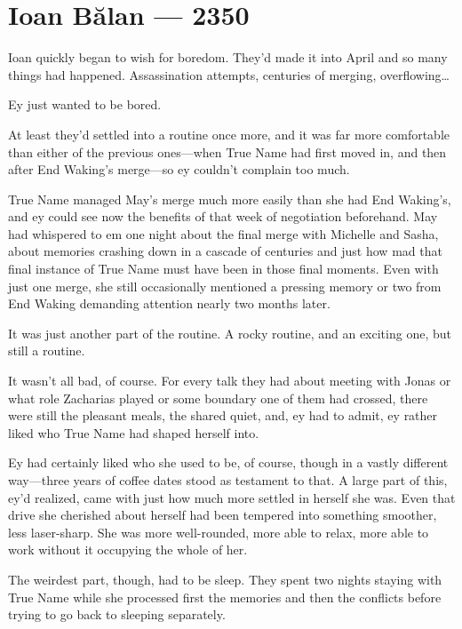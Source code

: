 \hypertarget{ioan-bux103lan-2350}{%
\chapter{Ioan Bălan — 2350}\label{ioan-bux103lan-2350}}

Ioan quickly began to wish for boredom. They'd made it into April and so many things had happened. Assassination attempts, centuries of merging, overflowing\ldots{}

Ey just wanted to be bored.

At least they'd settled into a routine once more, and it was far more comfortable than either of the previous ones—when True Name had first moved in, and then after End Waking's merge—so ey couldn't complain too much.

True Name managed May's merge much more easily than she had End Waking's, and ey could see now the benefits of that week of negotiation beforehand. May had whispered to em one night about the final merge with Michelle and Sasha, about memories crashing down in a cascade of centuries and just how mad that final instance of True Name must have been in those final moments. Even with just one merge, she still occasionally mentioned a pressing memory or two from End Waking demanding attention nearly two months later.

It was just another part of the routine. A rocky routine, and an exciting one, but still a routine.

It wasn't all bad, of course. For every talk they had about meeting with Jonas or what role Zacharias played or some boundary one of them had crossed, there were still the pleasant meals, the shared quiet, and, ey had to admit, ey rather liked who True Name had shaped herself into.

Ey had certainly liked who she used to be, of course, though in a vastly different way—three years of coffee dates stood as testament to that. A large part of this, ey'd realized, came with just how much more settled in herself she was. Even that drive she cherished about herself had been tempered into something smoother, less laser-sharp. She was more well-rounded, more able to relax, more able to work without it occupying the whole of her.

The weirdest part, though, had to be sleep. They spent two nights staying with True Name while she processed first the memories and then the conflicts before trying to go back to sleeping separately.

